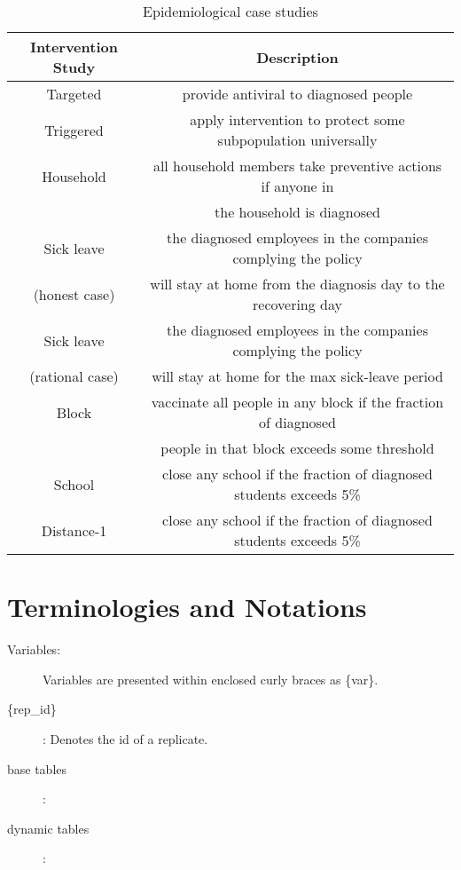 \documentclass{book}
\newcommand{\rid}{\{rep\_id\}}
\begin{document}
\begin{table}[!ht]
\begin{center} 
\caption{Epidemiological case studies}
\label{table:Epidemiological case studies}
\begin{tabular}{|c|c|}
	\hline 
 \textbf{Intervention Study} & \textbf{Description} \\ \hline
 Targeted  & provide antiviral to diagnosed people \\ \hline
 Triggered & apply intervention to protect some subpopulation universally \\ \hline
 Household & all household members take preventive actions if anyone in \\
					 & the household is diagnosed \\ \hline
 Sick leave       & the diagnosed employees in the companies complying the policy \\ 
	(honest case) 	& will stay at home from the diagnosis day to the recovering day \\ \hline 	
 Sick leave       & the diagnosed employees in the companies complying the policy \\
	(rational case) & will stay at home for the max sick-leave period \\ \hline
 Block & vaccinate all people in any block if the fraction of diagnosed \\ 
			 & people in that block exceeds some threshold \\ \hline
 School & close any school if the fraction of diagnosed students exceeds 5\% \\ \hline
 Distance-1 & close any school if the fraction of diagnosed students exceeds 5\% \\ \hline
\end{tabular} 
\end{center}
\end{table}

\section{Terminologies and Notations}
\begin{description}
\item[Variables:] Variables are presented within enclosed curly braces as  \{var\}.
\item[{\rid}]: Denotes the id of a replicate.
\item[base tables]:
\item[dynamic tables]:
\end{description}


%
%
\end{document}
